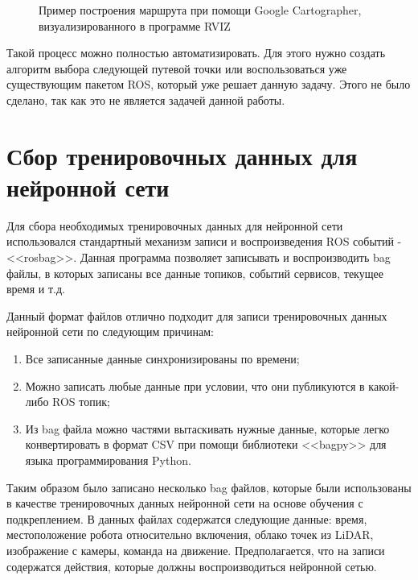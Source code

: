 \begin{figure}[ht]
    \caption{Пример построения маршрута при помощи Google Cartographer, визуализированного в программе RVIZ}\label{fig:path}
\end{figure}

Такой процесс можно полностью автоматизировать. Для этого нужно создать алгоритм выбора следующей путевой точки или воспользоваться уже существующим пакетом ROS, который уже решает данную задачу. Этого не было сделано, так как это не является задачей данной работы.

\section{Сбор тренировочных данных для нейронной сети}

Для сбора необходимых тренировочных данных для нейронной сети использовался стандартный механизм записи и воспроизведения ROS событий - <<rosbag>>. Данная программа позволяет записывать и воспроизводить bag файлы, в которых записаны все данные топиков, событий сервисов, текущее время и т.д. 

Данный формат файлов отлично подходит для записи тренировочных данных нейронной сети по следующим причинам:

\begin{enumerate}[beginpenalty=10000] %
  \item Все записанные данные синхронизированы по времени;
  \item Можно записать любые данные при условии, что они публикуются в какой-либо ROS топик; 
  \item Из bag файла можно частями вытаскивать нужные данные, которые легко конвертировать в формат CSV при помощи библиотеки <<bagpy>> для языка программирования Python.
\end{enumerate}

Таким образом было записано несколько bag файлов, которые были использованы в качестве тренировочных данных нейронной сети на основе обучения с подкреплением. В данных файлах содержатся следующие данные: время, местоположение робота относительно включения, облако точек из LiDAR, изображение с камеры, команда на движение. Предполагается, что на записи содержатся действия, которые должны воспроизводиться нейронной сетью. 

\clearpage
